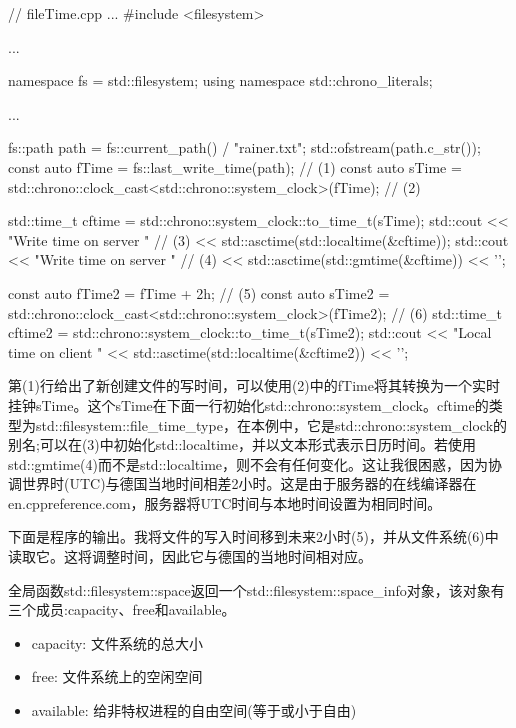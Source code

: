 \begin{cpp}
// fileTime.cpp
...
#include <filesystem>

...

namespace fs = std::filesystem;
using namespace std::chrono_literals;

...

fs::path path = fs::current_path() / "rainer.txt";
std::ofstream(path.c_str());
const auto fTime = fs::last_write_time(path); // (1)
const auto sTime = std::chrono::clock_cast<std::chrono::system_clock>(fTime); // (2)


std::time_t cftime = std::chrono::system_clock::to_time_t(sTime);
std::cout << "Write time on server " // (3)
		  << std::asctime(std::localtime(&cftime));
std::cout << "Write time on server " // (4)
		  << std::asctime(std::gmtime(&cftime)) << '\n';

const auto fTime2 = fTime + 2h; // (5)
const auto sTime2 = std::chrono::clock_cast<std::chrono::system_clock>(fTime2); // (6)
std::time_t cftime2 = std::chrono::system_clock::to_time_t(sTime2);
std::cout << "Local time on client "
		  << std::asctime(std::localtime(&cftime2)) << '\n';
\end{cpp}

第(1)行给出了新创建文件的写时间，可以使用(2)中的fTime将其转换为一个实时挂钟sTime。这个sTime在下面一行初始化std::chrono::system\_clock。cftime的类型为std::filesystem::file\_time\_type，在本例中，它是std::chrono::system\_clock的别名;可以在(3)中初始化std::localtime，并以文本形式表示日历时间。若使用std::gmtime(4)而不是std::localtime，则不会有任何变化。这让我很困惑，因为协调世界时(UTC)与德国当地时间相差2小时。这是由于服务器的在线编译器在en.cppreference.com，服务器将UTC时间与本地时间设置为相同时间。

下面是程序的输出。我将文件的写入时间移到未来2小时(5)，并从文件系统(6)中读取它。这将调整时间，因此它与德国的当地时间相对应。



全局函数std::filesystem::space返回一个std::filesystem::space\_info对象，该对象有三个成员:capacity、free和available。

\begin{itemize}
\item 
capacity: 文件系统的总大小

\item 
free: 文件系统上的空闲空间

\item 
available: 给非特权进程的自由空间(等于或小于自由)
\end{itemize}

